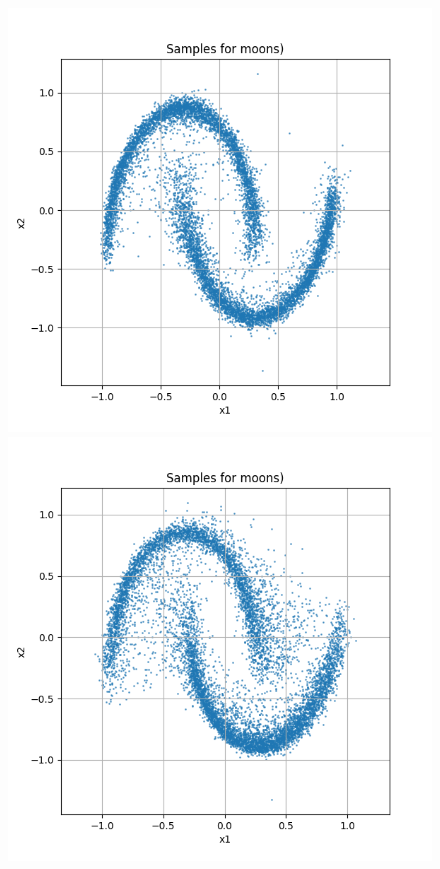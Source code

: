 \documentclass[a4paper,12pt]{article}
\begin{document}
\begin{figure}[H]
  \begin{minipage}{0.3\textwidth}
      \centering
      \includegraphics[width=\linewidth]{"images/Samples for ddpm_2_100_0.0001_0.02_moons.png"}
  \end{minipage}
  \begin{minipage}{0.3\textwidth}
      \centering
      \includegraphics[width=\linewidth]{"images/Samples for ddpm_2_150_0.0001_0.02_moons.png"}

\end{minipage}
\end{figure}
\end{document}
